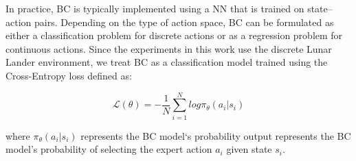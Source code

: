 In practice, BC is typically implemented using a NN that is trained on state–action pairs. Depending on the type of action space, BC can be formulated as either a classification problem for discrete actions or as a regression problem for continuous actions. Since the experiments in this work use the discrete Lunar Lander environment, we treat BC as a classification model trained using the Cross-Entropy loss defined as:

$$\mathcal{L} (\theta) = - \frac{1}{N} \sum_{i=1}^N log  \pi_\theta (a_i | s_i)$$


where $\pi_\theta(a_i|s_i)$ represents the BC model`s probability output represents the BC model’s probability of selecting the expert action $a_i$ given state $s_i$.


